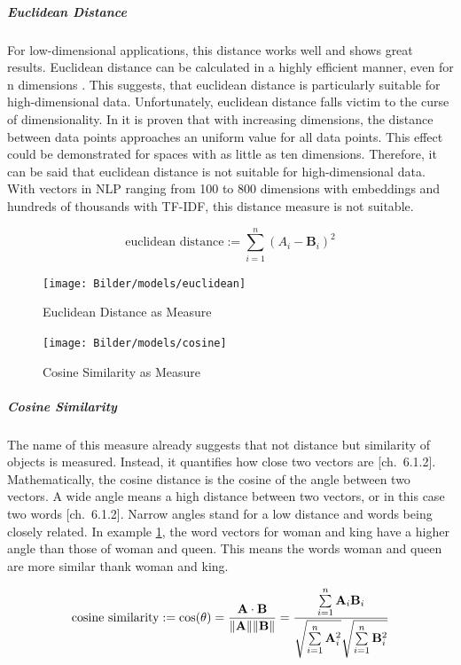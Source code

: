 	
		\subparagraph{Euclidean Distance} \label{euclidean}
		For low-dimensional applications, this distance works well and shows great results. Euclidean distance can be calculated in a highly efficient manner, even for n dimensions \cite[ch.~6.2]{40algorithms}. This suggests, that euclidean distance is particularly suitable for high-dimensional data. Unfortunately, euclidean distance falls victim to the curse of dimensionality. In \cite[p.~1]{beyerNearestNeighbor} it is proven that with increasing dimensions, the distance between data points approaches an uniform value for all data points. This effect could be demonstrated for spaces with as little as ten dimensions. Therefore, it can be said that euclidean distance is not suitable for high-dimensional data. With vectors in \ac{NLP} ranging from 100 to 800 dimensions with embeddings and hundreds of thousands with \ac{TF-IDF}, this distance measure is not suitable.
		
				\[ 
		\text{euclidean distance} :=  \sum\limits_{i=1}^{n}{(A_i -  \mathbf{B}_i)^{2}} 
		\]
		
		\begin{figure} 
			\begin{minipage}{0.49\textwidth}
				\label{fig:euclidean}
				
				\texttt{[image: Bilder/models/euclidean]}
				\caption{Euclidean Distance as Measure}
			\end{minipage}
			\hfill
			\begin{minipage}{0.49\textwidth}
				\texttt{[image: Bilder/models/cosine]}
				\caption{Cosine Similarity as Measure}
				\label{fig:cosine}
			\end{minipage}
			\hfill
		\end{figure} 
	
		\subparagraph{Cosine Similarity}
		The name of this measure already suggests that not distance but similarity of objects is measured. Instead, it quantifies how close two vectors are [ch.~6.1.2].  Mathematically, the cosine distance is the cosine of the angle between two vectors. A wide angle means a high distance between two vectors, or in this case two words [ch.~6.1.2]. Narrow angles stand for a low distance and words being closely related. In example \ref{fig:cosine}, the word vectors for woman and king have a higher angle than those of woman and queen. This means the words woman and queen are more similar thank woman and king.
		
		\[ 
		\text{cosine similarity} := \cos(\theta) = {\mathbf{A} \cdot \mathbf{B} \over \|\mathbf{A}\| \|\mathbf{B}\|} = \frac{ \sum\limits_{i=1}^{n}{\mathbf{A}_i  \mathbf{B}_i} }{ \sqrt{\sum\limits_{i=1}^{n}{\mathbf{A}_i^2}}  \sqrt{\sum\limits_{i=1}^{n}{\mathbf{B}_i^2}} }
		  \]
		
